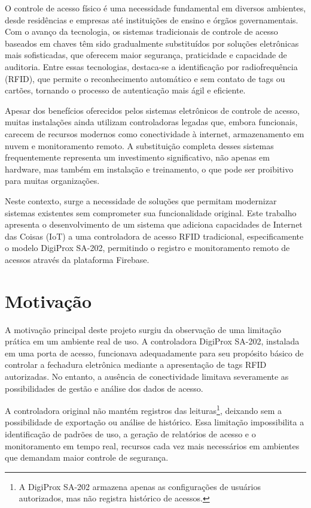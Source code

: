 
\label{Cap:Introducao}

O controle de acesso físico é uma necessidade fundamental em diversos ambientes, desde residências e empresas até instituições de ensino e órgãos governamentais. Com o avanço da tecnologia, os sistemas tradicionais de controle de acesso baseados em chaves  têm sido gradualmente substituídos por soluções eletrônicas mais sofisticadas, que oferecem maior segurança, praticidade e capacidade de auditoria. Entre essas tecnologias, destaca-se a identificação por radiofrequência (RFID), que permite o reconhecimento automático e sem contato de tags ou cartões, tornando o processo de autenticação mais ágil e eficiente.

Apesar dos benefícios oferecidos pelos sistemas eletrônicos de controle de acesso, muitas instalações ainda utilizam controladoras legadas que, embora funcionais, carecem de recursos modernos como conectividade à internet, armazenamento em nuvem e monitoramento remoto. A substituição completa desses sistemas frequentemente representa um investimento significativo, não apenas em hardware, mas também em instalação e treinamento, o que pode ser proibitivo para muitas organizações.

Neste contexto, surge a necessidade de soluções que permitam modernizar sistemas existentes sem comprometer sua funcionalidade original. Este trabalho apresenta o desenvolvimento de um sistema que adiciona capacidades de Internet das Coisas (IoT) a uma controladora de acesso RFID tradicional, especificamente o modelo DigiProx SA-202, permitindo o registro e monitoramento remoto de acessos através da plataforma Firebase.

\section{Motivação}

A motivação principal deste projeto surgiu da observação de uma limitação prática em um ambiente real de uso. A controladora DigiProx SA-202, instalada em uma porta de acesso, funcionava adequadamente para seu propósito básico de controlar a fechadura eletrônica mediante a apresentação de tags RFID autorizadas. No entanto, a ausência de conectividade limitava severamente as possibilidades de gestão e análise dos dados de acesso.

A controladora original não mantém registros das leituras\footnote{A DigiProx SA-202 armazena apenas as configurações de usuários autorizados, mas não registra histórico de acessos.}, deixando sem a possibilidade de exportação ou análise de histórico. Essa limitação impossibilita a identificação de padrões de uso, a geração de relatórios de acesso e o monitoramento em tempo real, recursos cada vez mais necessários em ambientes que demandam maior controle de segurança.

